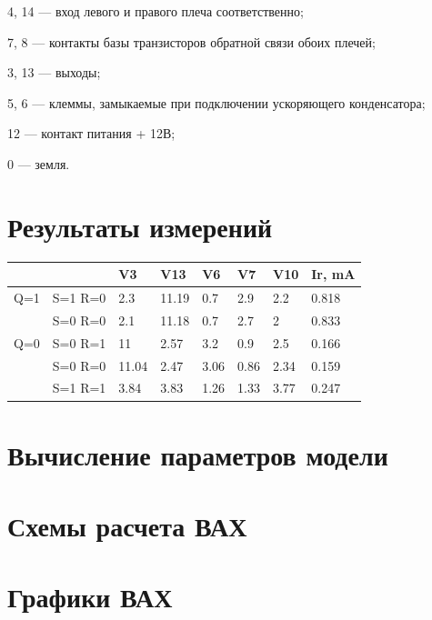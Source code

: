 \documentclass[a4paper,14pt]{article}
\begin{document}
4, 14 — вход левого и правого плеча соответственно;

7, 8 — контакты базы транзисторов обратной связи обоих плечей;

3, 13 — выходы;

5, 6 — клеммы, замыкаемые при подключении ускоряющего конденсатора;

12 — контакт питания + 12В;

0 — земля.

\section{Результаты измерений}

\begin{table}[H]
	\begin{center}
	\begin{tabular}{|l|l|l|l|l|l|l|l|}
		\hline
		&         & V3    & V13   & V6   & V7   & V10  & Ir, mA \\ \hline
		Q=1 & S=1 R=0 & 2.3   & 11.19 & 0.7  & 2.9  & 2.2  & 0.818  \\ \hline
		& S=0 R=0 & 2.1   & 11.18 & 0.7  & 2.7  & 2    & 0.833  \\ \hline
		Q=0 & S=0 R=1 & 11    & 2.57  & 3.2  & 0.9  & 2.5  & 0.166  \\ \hline
		& S=0 R=0 & 11.04 & 2.47  & 3.06 & 0.86 & 2.34 & 0.159  \\ \hline
		& S=1 R=1 & 3.84  & 3.83  & 1.26 & 1.33 & 3.77 & 0.247  \\ \hline
	\end{tabular}
\end{center}
\end{table}



\section{Вычисление параметров модели}

\section{Схемы расчета ВАХ}

\section{Графики ВАХ}
\end{document}
